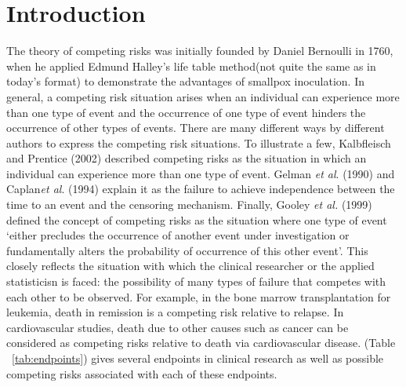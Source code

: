 \documentclass[times, doublespace]{simauth}
\begin{document}
\section{Introduction}
The theory of competing risks was initially founded by Daniel Bernoulli in 1760, when he applied Edmund Halley's life table method(not quite the same as in today's format) to demonstrate the advantages of smallpox inoculation\cite{pintilie06}. In general, a competing risk situation arises when an individual can experience more than one type of event and the occurrence of one type of event hinders the occurrence of other types of events\cite{pintilie06}. There are many different ways by different authors to express the competing risk situations. To illustrate a few, Kalbfleisch and Prentice (2002)\cite{Kalb02} described competing risks as the situation in which an individual can experience more than one type of event\cite{pintilie06}. Gelman {\it et al}. (1990)\cite{Gel90} and Caplan{\it et al}. (1994)\cite{Cap94} explain it as the failure to achieve independence between the time to an event and the censoring mechanism\cite{pintilie06}. Finally, Gooley {\it et al.} (1999)\cite{Goo99} defined the concept of competing risks as the situation where one type of event `either precludes the occurrence of another event under investigation or fundamentally alters the probability of occurrence of this other event'\cite{pintilie06}. This closely reflects the situation with which the clinical researcher or the applied statisticisn is faced: the possibility of many types of failure that competes with each other to be observed\cite{pintilie06}. For example, in the bone marrow transplantation for leukemia, death in remission is a competing risk relative to relapse. In cardiovascular studies, death due to other causes such as cancer can be considered as competing risks relative to death via cardiovascular disease. (Table ~\ref{tab:endpoints}) \cite{pintilie06} gives several endpoints in clinical research as well as possible competing risks associated with each of these endpoints.
\end{document}
